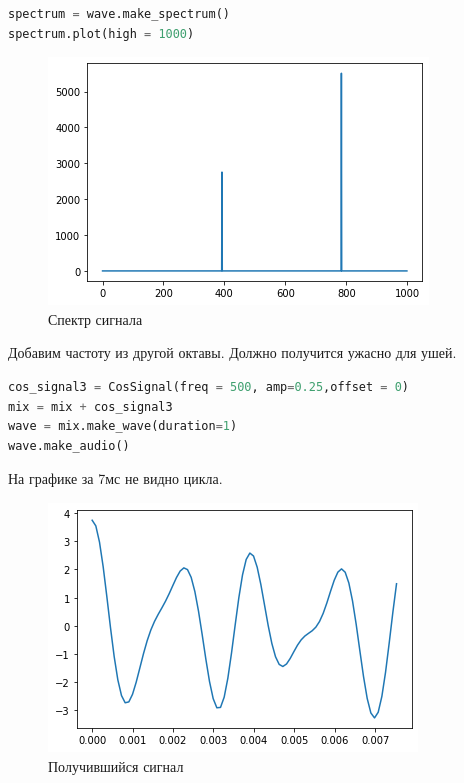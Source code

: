 \begin{lstlisting}[language=Python]
spectrum = wave.make_spectrum()
spectrum.plot(high = 1000)
\end{lstlisting}

\begin{figure}[H]
	\begin{center}
		\includegraphics[scale=1]{fig/lab01/lab01_35_0.png}
		\caption{Спектр сигнала}
	\end{center}
\end{figure}

Добавим частоту из другой октавы. Должно получится ужасно для ушей.

\begin{lstlisting}[language=Python]
cos_signal3 = CosSignal(freq = 500, amp=0.25,offset = 0)
mix = mix + cos_signal3
wave = mix.make_wave(duration=1)
wave.make_audio()
\end{lstlisting}

На графике за 7мс не видно цикла.
\begin{figure}[H]
	\begin{center}
		\includegraphics[scale=1]{fig/lab01/lab01_39_0.png}
		\caption{Получившийся сигнал}
	\end{center}
\end{figure}

